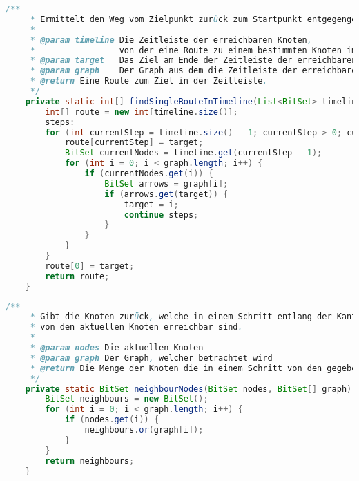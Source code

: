 \documentclass[a4paper,10pt,ngerman]{scrartcl}
\begin{document}
    \begin{lstlisting}[frame=single,language=Java,title=Methode findSingleRouteInTimeline,breaklines=true]
    /**
     * Ermittelt den Weg vom Zielpunkt zurück zum Startpunkt entgegengesetzt der Kantenrichtung des Graphen.
     *
     * @param timeline Die Zeitleiste der erreichbaren Knoten,
     *                 von der eine Route zu einem bestimmten Knoten im letzten Zeitpunkt der Zeitleiste gebaut werden soll.
     * @param target   Das Ziel am Ende der Zeitleiste der erreichbaren Knoten, zudem eine Route gebaut werden soll.
     * @param graph    Der Graph aus dem die Zeitleiste der erreichbaren Knoten (und dementsprechend auch das Ziel) stammt.
     * @return Eine Route zum Ziel in der Zeitleiste.
     */
    private static int[] findSingleRouteInTimeline(List<BitSet> timeline, int target, BitSet[] graph) {
        int[] route = new int[timeline.size()];
        steps:
        for (int currentStep = timeline.size() - 1; currentStep > 0; currentStep--) {
            route[currentStep] = target;
            BitSet currentNodes = timeline.get(currentStep - 1);
            for (int i = 0; i < graph.length; i++) {
                if (currentNodes.get(i)) {
                    BitSet arrows = graph[i];
                    if (arrows.get(target)) {
                        target = i;
                        continue steps;
                    }
                }
            }
        }
        route[0] = target;
        return route;
    }
    \end{lstlisting}


    \begin{lstlisting}[frame=single,language=Java,title=Methode neighbourNodes,breaklines=true]
    /**
     * Gibt die Knoten zurück, welche in einem Schritt entlang der Kantenrichtung,
     * von den aktuellen Knoten erreichbar sind.
     *
     * @param nodes Die aktuellen Knoten
     * @param graph Der Graph, welcher betrachtet wird
     * @return Die Menge der Knoten die in einem Schritt von den gegebenen Knoten erreichbar ist
     */
    private static BitSet neighbourNodes(BitSet nodes, BitSet[] graph) {
        BitSet neighbours = new BitSet();
        for (int i = 0; i < graph.length; i++) {
            if (nodes.get(i)) {
                neighbours.or(graph[i]);
            }
        }
        return neighbours;
    }
    \end{lstlisting}
\end{document}
